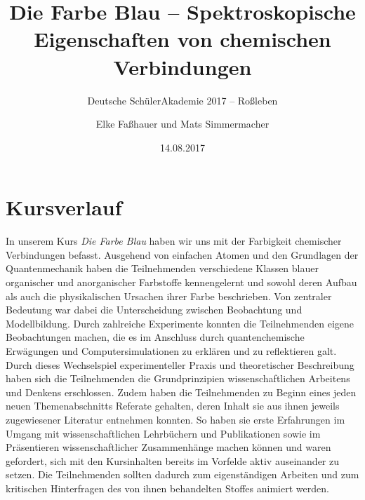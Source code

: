 \documentclass{scrartcl}
\begin{document}
\titlehead{Kursleiterbericht Ro{\ss}leben 2017--5.2}
\subject{Bericht}
\title{Die Farbe Blau -- Spektroskopische Eigenschaften von chemischen Verbindungen}
\subtitle{Deutsche Sch{\"u}lerAkademie 2017 -- Ro{\ss}leben}
\author{Elke Fa{\ss}hauer und Mats Simmermacher}
\date{14.08.2017}
\maketitle

\section*{Kursverlauf}

In unserem Kurs \textit{Die Farbe Blau} haben wir uns mit der Farbigkeit chemischer Verbindungen befasst. Ausgehend von einfachen Atomen und den Grundlagen der Quantenmechanik haben die Teilnehmenden verschiedene Klassen blauer organischer und anorganischer Farbstoffe kennengelernt und sowohl deren Aufbau als auch die physikalischen Ursachen ihrer Farbe beschrieben. Von zentraler Bedeutung war dabei die Unterscheidung zwischen Beobachtung und Modellbildung. Durch zahlreiche Experimente konnten die Teilnehmenden eigene Beobachtungen machen, die es im Anschluss durch quantenchemische Erw{\"a}gungen und Computersimulationen zu erkl{\"a}ren und zu reflektieren galt. Durch dieses Wechselspiel experimenteller Praxis und theoretischer Beschreibung haben sich die Teilnehmenden die Grundprinzipien wissenschaftlichen Arbeitens und Denkens erschlossen. Zudem haben die Teilnehmenden zu Beginn eines jeden neuen Themenabschnitts Referate gehalten, deren Inhalt sie aus ihnen jeweils zugewiesener Literatur entnehmen konnten. So haben sie erste Erfahrungen im Umgang mit wissenschaftlichen Lehrb{\"u}chern und Publikationen sowie im Pr{\"a}sentieren wissenschaftlicher Zusammenh{\"a}nge machen k{\"o}nnen und waren gefordert, sich mit den Kursinhalten bereits im Vorfelde aktiv auseinander zu setzen. Die Teilnehmenden sollten dadurch zum eigenst{\"a}ndigen Arbeiten und zum kritischen Hinterfragen des von ihnen behandelten Stoffes animiert werden.\medskip
\end{document}
